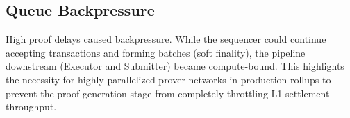 \subsection{Queue Backpressure}
High proof delays caused backpressure. While the sequencer could continue accepting transactions and forming batches (soft finality), the pipeline downstream (Executor and Submitter) became compute-bound. This highlights the necessity for highly parallelized prover networks in production rollups to prevent the proof-generation stage from completely throttling L1 settlement throughput.